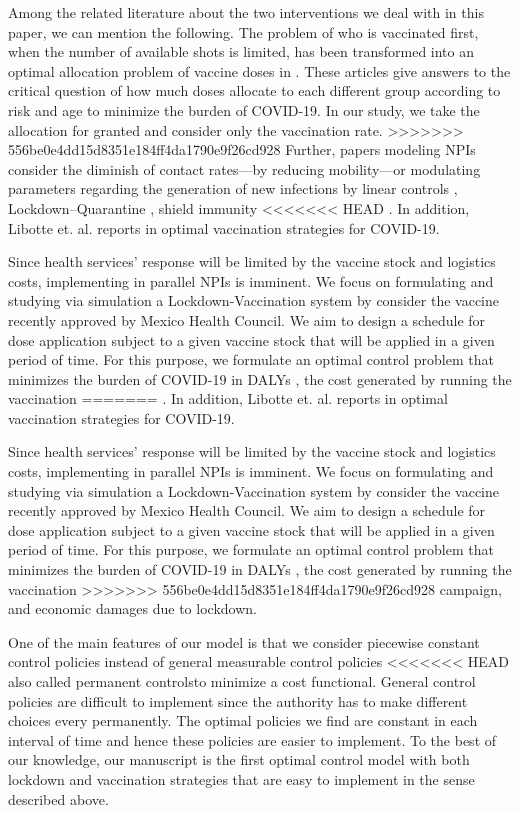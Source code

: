 Among the related literature about the two interventions we deal with in this 
paper, we can mention the following. The problem of who is vaccinated first, 
when the number of  available shots is limited, has been transformed into an 
optimal allocation problem of vaccine doses in \cite{Bubar2020,Matrajt2020}.  
These articles give answers to the critical question of how much doses 
allocate to each different group according to risk and age to minimize the 
burden of COVID-19. In our study, we take the allocation for granted and 
consider only the vaccination rate. 
>>>>>>> 556be0e4dd15d8351e184ff4da1790e9f26cd928
Further, papers modeling NPIs consider the diminish of contact rates---by
reducing mobility---or modulating parameters regarding the generation of new
infections by linear controls \cite{Naraigh2020,Ullah2020},
Lockdown--Quarantine \cite{Mandal2020},  shield immunity
<<<<<<< HEAD
\cite{Weitz2020}. In addition, Libotte et. al. reports in \cite{Libotte2020}
optimal vaccination strategies for COVID-19.

    Since health services' response will be limited by the vaccine stock
and logistics costs, implementing in parallel NPIs is imminent. We focus on
formulating and studying via simulation a Lockdown-Vaccination system by
consider the vaccine recently approved by  Mexico Health Council.     We aim to
design a schedule for dose application subject to a given vaccine stock that
will be applied in a given period of time. For this purpose, we formulate an
optimal control problem that minimizes the burden of  COVID-19 in DALYs
\cite{WhoDALY}, the cost generated by   running the vaccination
=======
\cite{Weitz2020}. In addition, Libotte et. al. reports in \cite{Libotte2020} 
optimal vaccination strategies for COVID-19. 

    Since health services' response will be limited by the vaccine stock
and logistics costs, implementing in parallel NPIs is imminent. We focus on
formulating and studying via simulation a Lockdown-Vaccination system by 
consider the vaccine recently approved by  Mexico Health Council.     We aim to 
design a schedule for dose application subject to a given vaccine stock that 
will be applied in a given period of time. For this purpose, we formulate an 
optimal control problem that minimizes the burden of  COVID-19 in DALYs 
\cite{WhoDALY}, the cost generated by   running the vaccination 
>>>>>>> 556be0e4dd15d8351e184ff4da1790e9f26cd928
campaign, and economic damages due to lockdown.

    One of the main features of our model is that we consider piecewise
constant control policies instead of general measurable control policies
<<<<<<< HEAD
\textemdash also called permanent controls\textemdash to minimize a cost
functional. General control policies are difficult to implement since the
authority has to make different choices every permanently. The optimal policies
we find are constant in each interval of time and hence these policies are
easier to implement. To the best of our knowledge, our manuscript is the first
optimal control model with both lockdown and vaccination strategies that are
easy to implement in the sense described above.


